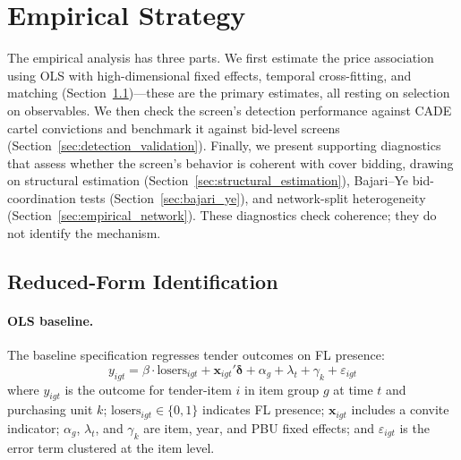 

\section{Empirical Strategy}
\label{sec:empirical}

The empirical analysis has three parts. We first estimate the
price association using OLS with high-dimensional fixed effects,
temporal cross-fitting, and matching
(Section~\ref{sec:reduced_form})---these are the primary estimates, all
resting on selection on observables. We then check the screen's
detection performance against CADE cartel convictions and benchmark
it against bid-level screens
(Section~\ref{sec:detection_validation}). Finally, we present supporting diagnostics that assess whether the
screen's behavior is coherent with cover bidding, drawing on
structural estimation (Section~\ref{sec:structural_estimation}),
Bajari--Ye bid-coordination tests (Section~\ref{sec:bajari_ye}),
and network-split heterogeneity
(Section~\ref{sec:empirical_network}). These diagnostics check
coherence; they do not identify the mechanism.


\subsection{Reduced-Form Identification}
\label{sec:reduced_form}

\paragraph{OLS baseline.}
The baseline specification regresses tender outcomes on FL presence:
\begin{equation}
  y_{igt} = \beta \cdot \text{losers}_{igt} + \mathbf{x}_{igt}'
  \boldsymbol{\delta} + \alpha_g + \lambda_t + \gamma_k + \varepsilon_{igt}
  \label{eq:ols_main}
\end{equation}
where $y_{igt}$ is the outcome for tender-item $i$ in item group $g$ at
time $t$ and purchasing unit $k$; $\text{losers}_{igt} \in \{0,1\}$
indicates FL presence; $\mathbf{x}_{igt}$ includes a convite indicator;
$\alpha_g$, $\lambda_t$, and $\gamma_k$ are item, year, and PBU fixed
effects; and $\varepsilon_{igt}$ is the error term clustered at the item
level.

